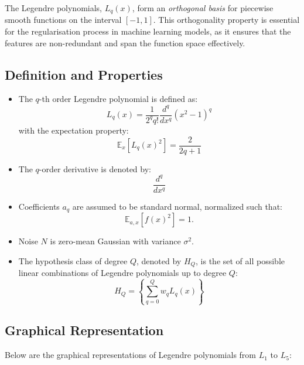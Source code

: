 The Legendre polynomials, \(L_q(x)\), form an \textit{orthogonal basis} for piecewise smooth functions on the interval \([-1, 1]\). This orthogonality property is essential for the regularisation process in machine learning models, as it ensures that the features are non-redundant and span the function space effectively.

\subsection*{Definition and Properties}
\begin{itemize}
  \item The \(q\)-th order Legendre polynomial is defined as:
  \[
  L_q(x) = \frac{1}{2^q q!} \frac{d^q}{dx^q} \left( x^2 - 1 \right)^q
  \]
  with the expectation property:
  \[
  \mathbb{E}_x \left[ L_q(x)^2 \right] = \frac{2}{2q + 1}
  \]
  
  \item The \(q\)-order derivative is denoted by:
  \[
  \frac{d^q}{dx^q}
  \]
  
  \item Coefficients \(a_q\) are assumed to be standard normal, normalized such that:
  \[
  \mathbb{E}_{a,x} \left[ f(x)^2 \right] = 1.
  \]
  
  \item Noise \(N\) is zero-mean Gaussian with variance \(\sigma^2\).
  
  \item The hypothesis class of degree \(Q\), denoted by \(H_Q\), is the set of all possible linear combinations of Legendre polynomials up to degree \(Q\):
  \[
  H_Q = \left\{ \sum_{q=0}^{Q} w_q L_q(x) \right\}
  \]
\end{itemize}

\subsection*{Graphical Representation}
Below are the graphical representations of Legendre polynomials from \(L_1\) to \(L_5\):

